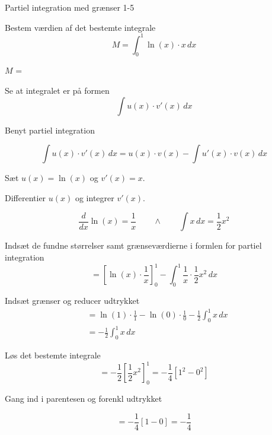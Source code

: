 \documentclass{article}
\begin{document}
\begin{exercise}{Partiel integration med grænser 1-5}
	
	
	Bestem værdien af det bestemte integrale
	\[
	M = \int_0^1 \ln(x) \cdot x \, dx
	\]
	
	$M$ =  
	
	
	\hint
	
	Se at integralet er på formen
	\[
	\int u(x) \cdot v'(x) \, dx
	\]
	
	\hint
	
	Benyt partiel integration
	
	\hint
	\[
	\int u(x) \cdot v'(x)\, dx = u(x) \cdot v(x) - \int u'(x) \cdot v(x) \, dx
	\]
	\hint
	
	Sæt $u(x) = \ln(x)$ og $v'(x) = x$.
	
	
	\hint
	
	Differentier $u(x)$ og integrer $v'(x)$.
	
	\hint
	\[
	\frac{d}{dx} \ln(x) = \frac{1}{x}  \qquad \wedge \qquad \int x \, dx = \frac{1}{2} x^2
	\]
	
	\hint
	
	Indsæt de fundne størrelser samt grænseværdierne i formlen for partiel integration 
	\[
	= \left[\ln(x) \cdot \frac{1}{x}\right]_{0}^{1} - \int_{0}^{1} \frac{1}{x} \cdot \frac{1}{2}x^2 \, dx
	\]
	
	\hint
	
	Indsæt grænser og reducer udtrykket
	\begin{align*}
	&= \ln(1) \cdot \frac{1}{1}  - \ln(0) \cdot \frac{1}{0}  -  \frac{1}{2} \int_{0}^{1} x  \, dx \\
	&= -  \frac{1}{2} \int_{0}^{1} x  \, dx 
	\end{align*}
	
	\hint
	Løs det bestemte integrale
	\[
	=  - \frac{1}{2} \left[ \frac{1}{2}x^2  \right]_{0}^{1} = - \frac{1}{4} \left[ 1^2 - 0^2 \right]
	\]
	
	\hint
	Gang ind i parentesen og forenkl udtrykket
	
	\hint
	\[
	= - \frac{1}{4} \left[ 1 - 0\right] = -\frac{1}{4}
	\]
	
	
	
\end{exercise}

\newpage
\end{document}
